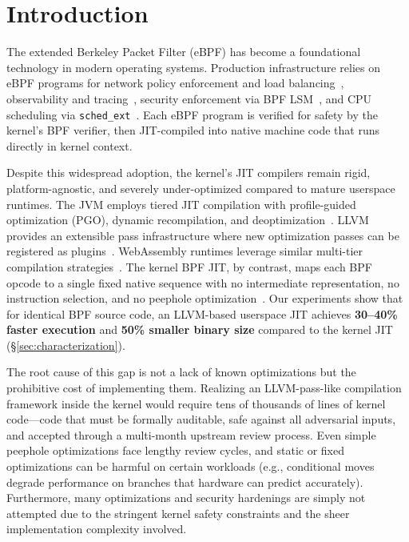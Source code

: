 \documentclass[sigconf,anonymous]{acmart}
\begin{document}


\maketitle

\section{Introduction}
\label{sec:intro}

The extended Berkeley Packet Filter (eBPF) has become a foundational
technology in modern operating systems. Production infrastructure
relies on eBPF programs for network policy enforcement and load
balancing~\cite{cilium,katran}, observability and
tracing~\cite{bcc,tracee}, security enforcement via BPF
LSM~\cite{krsi}, and CPU scheduling via
\texttt{sched\_ext}~\cite{sched_ext}. Each eBPF program is verified
for safety by the kernel's BPF verifier, then JIT-compiled into native
machine code that runs directly in kernel context.

Despite this widespread adoption, the kernel's JIT compilers remain
rigid, platform-agnostic, and severely under-optimized compared to
mature userspace runtimes. The JVM employs tiered JIT compilation
with profile-guided optimization (PGO), dynamic recompilation, and
deoptimization~\cite{jvm_hotspot}. LLVM provides an extensible pass
infrastructure where new optimization passes can be registered as
plugins~\cite{llvm}. WebAssembly runtimes leverage similar multi-tier
compilation strategies~\cite{wasmtime}. The kernel BPF JIT, by
contrast, maps each BPF opcode to a single fixed native sequence with
no intermediate representation, no instruction selection, and no
peephole optimization~\cite{linux_bpf_jit}. Our experiments show that
for identical BPF source code, an LLVM-based userspace JIT achieves
\textbf{30--40\% faster execution} and \textbf{50\% smaller binary
size} compared to the kernel JIT (\S\ref{sec:characterization}).

The root cause of this gap is not a lack of known optimizations but
the prohibitive cost of implementing them. Realizing an LLVM-pass-like
compilation framework inside the kernel would require tens of
thousands of lines of kernel code---code that must be formally
auditable, safe against all adversarial inputs, and accepted through a
multi-month upstream review process. Even simple peephole
optimizations face lengthy review cycles, and static or fixed
optimizations can be harmful on certain workloads (e.g., conditional
moves degrade performance on branches that hardware can predict
accurately). Furthermore, many optimizations and security hardenings
are simply not attempted due to the stringent kernel safety constraints
and the sheer implementation complexity involved.
\end{document}
